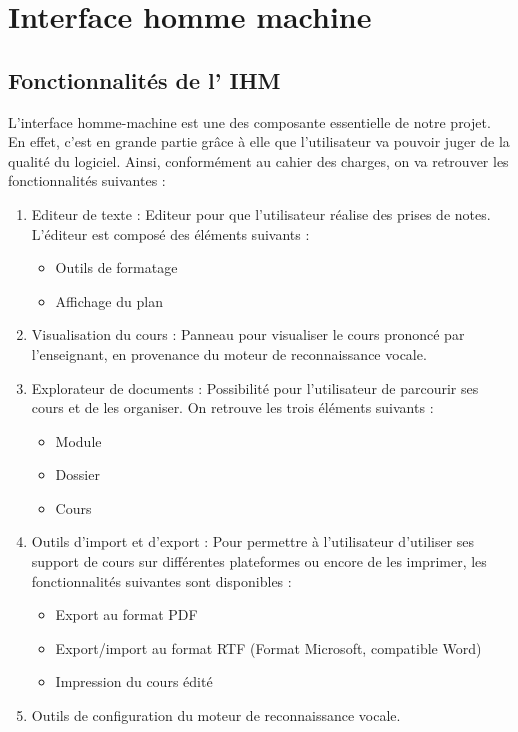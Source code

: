 
\chapter{Interface homme machine}
\minitoc

\section{Fonctionnalités de l' IHM}

L'interface homme-machine est une des composante essentielle de notre projet. En effet, c'est en grande partie grâce à elle que l'utilisateur va pouvoir juger de la qualité du logiciel. Ainsi, conformément au  cahier des charges, on va retrouver les fonctionnalités suivantes :

\begin{enumerate}

 \item Editeur de texte : Editeur  pour que l'utilisateur réalise des prises de notes. L'éditeur est composé des éléments suivants :
	
\begin{itemize}
 \item Outils de formatage
 \item Affichage du plan 
\end{itemize} 


\item Visualisation du cours : Panneau pour visualiser le cours prononcé par l'enseignant, en provenance du moteur de reconnaissance vocale.


 \item Explorateur de documents : Possibilité pour l'utilisateur de parcourir ses cours et de les organiser.  On retrouve les trois éléments suivants :

\begin{itemize}
 \item Module
 \item Dossier
 \item Cours
\end{itemize} 

\item Outils d'import et d'export : Pour permettre à l'utilisateur d'utiliser ses support de cours sur différentes plateformes ou encore de les imprimer, les fonctionnalités suivantes sont disponibles :

\begin{itemize}
 \item Export au format PDF
 \item Export/import au format RTF (Format Microsoft, compatible Word)
 \item Impression du cours édité
\end{itemize} 
 \item Outils de configuration du moteur de reconnaissance vocale.  
\end{enumerate}

